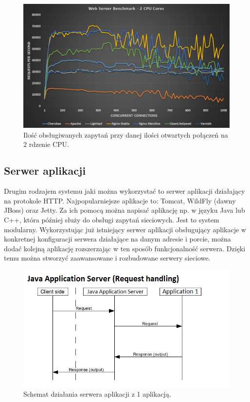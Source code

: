 \documentclass[archivemod, eng]{mgr}
\begin{document}
			\begin{center}
				\begin{figure}[H]
					\centering
					\includegraphics[scale=0.35]{web-server-performance-benchmark-2-cpu-cores-2.jpg}
					\caption{Ilość obsługiwanych zapytań przy danej ilości otwartych połączeń na 2 rdzenie CPU. \cite{webserverbenchmark}}
				\end{figure}
			\end{center}
		
			\subsection{Serwer aplikacji}
			Drugim rodzajem systemu jaki można wykorzystać to serwer aplikacji działający na protokole HTTP. Najpopularniejsze aplikacje \cite{mostpopularjavaservers} to: Tomcat, WildFly (dawny JBoss) oraz Jetty. Za ich pomocą można napisać aplikację np. w języku Java lub C++, która później służy do obsługi zapytań sieciowych. Jest to system modularny. Wykorzystując już istniejący serwer aplikacji obsługujący aplikacje w konkretnej konfiguracji serwera działające na danym adresie i porcie, można dodać kolejną aplikację rozszerzając w ten sposób funkcjonalność serwera. Dzięki temu można stworzyć zaawansowane i rozbudowane serwery sieciowe.
			
			\begin{center}
				\begin{figure}[H]
					\centering
					\includegraphics[scale=0.8]{flow_jas.png}
					\caption{Schemat działania serwera aplikacji z 1 aplikacją.}
				\end{figure}
			\end{center}
		
\end{document}

